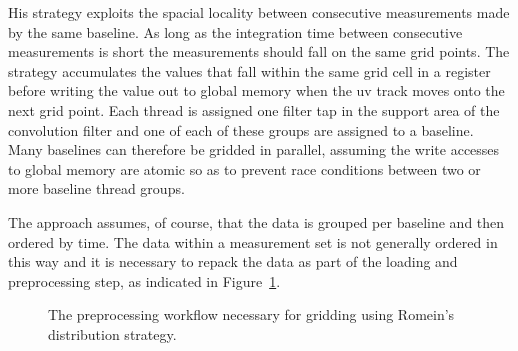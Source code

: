 His strategy exploits the spacial locality between consecutive measurements made by the same baseline. As long as the integration time
between consecutive measurements is short the measurements should fall on the same grid points. The strategy accumulates the values that fall 
within the same grid cell in a register before writing the value out to global memory when the uv track moves onto the next grid point.
Each thread is assigned one filter tap in the support area of the convolution filter and one of each of these groups are assigned to a baseline.
Many baselines can therefore be gridded in parallel, assuming the write accesses to global memory are atomic so as to prevent race conditions
between two or more baseline thread groups.

The approach assumes, of course, that the data is grouped per baseline and then ordered by time.
The data within a measurement set is not generally ordered in this way and it is necessary to repack the 
data as part of the loading and preprocessing step, as indicated in Figure~\ref{fig_gpu_preprocess}.
\begin{figure}[ht!]
 \begin{mdframed}
 \centering
 \caption[GPU preprocessing workflow]{The preprocessing workflow necessary for gridding using
 Romein's distribution strategy.}
 \label{fig_gpu_preprocess}
 \end{mdframed}
\end{figure}

